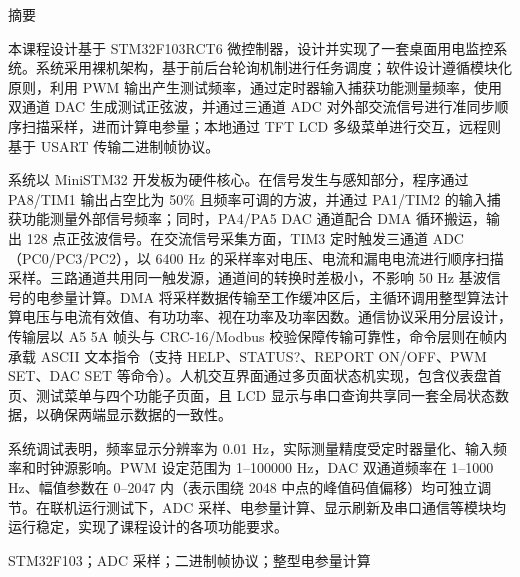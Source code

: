 \documentclass[UTF8,a4paper,zihao=-4,fontset=macnew]{ctexart}
\begin{document}
\setcounter{page}{1}
\thispagestyle{empty}
\setlength{\parindent}{2em}
\label{sec:abstract}
\vspace*{\fill}
\begin{center}
\begin{minipage}{0.85\textwidth}
\begin{center}
{\heiti{} 摘\quad 要}
\end{center}
\vspace{0.45cm}
\setlength{\parindent}{2em}

本课程设计基于 STM32F103RCT6 微控制器，设计并实现了一套桌面用电监控系统。系统采用裸机架构，基于前后台轮询机制进行任务调度；软件设计遵循模块化原则，利用 PWM 输出产生测试频率，通过定时器输入捕获功能测量频率，使用双通道 DAC 生成测试正弦波，并通过三通道 ADC 对外部交流信号进行准同步顺序扫描采样，进而计算电参量；本地通过 TFT LCD 多级菜单进行交互，远程则基于 USART 传输二进制帧协议。

系统以 MiniSTM32 开发板为硬件核心。在信号发生与感知部分，程序通过 PA8/TIM1 输出占空比为 50\% 且频率可调的方波，并通过 PA1/TIM2 的输入捕获功能测量外部信号频率；同时，PA4/PA5 DAC 通道配合 DMA 循环搬运，输出 128 点正弦波信号。在交流信号采集方面，TIM3 定时触发三通道 ADC（PC0/PC3/PC2），以 6400 Hz 的采样率对电压、电流和漏电电流进行顺序扫描采样。三路通道共用同一触发源，通道间的转换时差极小，不影响 50 Hz 基波信号的电参量计算。DMA 将采样数据传输至工作缓冲区后，主循环调用整型算法计算电压与电流有效值、有功功率、视在功率及功率因数。通信协议采用分层设计，传输层以 A5 5A 帧头与 CRC-16/Modbus 校验保障传输可靠性，命令层则在帧内承载 ASCII 文本指令（支持 HELP、STATUS?、REPORT ON/OFF、PWM SET、DAC SET 等命令）。人机交互界面通过多页面状态机实现，包含仪表盘首页、测试菜单与四个功能子页面，且 LCD 显示与串口查询共享同一套全局状态数据，以确保两端显示数据的一致性。

系统调试表明，频率显示分辨率为 0.01 Hz，实际测量精度受定时器量化、输入频率和时钟源影响。PWM 设定范围为 1--100000 Hz，DAC 双通道频率在 1--1000 Hz、幅值参数在 0--2047 内（表示围绕 2048 中点的峰值码值偏移）均可独立调节。在联机运行测试下，ADC 采样、电参量计算、显示刷新及串口通信等模块均运行稳定，实现了课程设计的各项功能要求。

\vspace{1.55cm}
STM32F103；ADC 采样；二进制帧协议；整型电参量计算
\end{minipage}
\end{center}
\vfill
\clearpage
\end{document}
